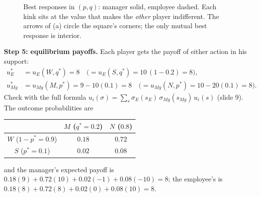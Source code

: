 \documentclass[11pt,a4paper]{article}
\begin{document}
\begin{figure}[ht]
\centering
{}
\caption{Best responses in $(p, q)$: manager solid, employee dashed. Each kink sits at the value
that makes the \emph{other} player indifferent. The arrows of (a) circle the square's corners; the
only mutual best response is interior.}
\label{fig:br}
\end{figure}

\textbf{Step 5: equilibrium payoffs.} Each player gets the payoff of either action in his support:
\begin{align*}
  u_E^* &= u_E(W, q^*) = 8 \quad\big(= u_E(S, q^*) = 10\,(1 - 0.2) = 8\big),\\
  u_{M\!g}^* &= u_{M\!g}(M, p^*) = 9 - 10(0.1) = 8 \quad\big(= u_{M\!g}(N, p^*) = 10 - 20(0.1) = 8\big).
\end{align*}
Check with the full formula $u_i(\sigma) = \sum_s \sigma_E(s_E)\,\sigma_{M\!g}(s_{M\!g})\,u_i(s)$
(slide 9). The outcome probabilities are
\begin{center}
\begin{tabular}{c|cc}
 & $M$ ($q^* = 0.2$) & $N$ ($0.8$) \\ \midrule
$W$ ($1 - p^* = 0.9$) & $0.18$ & $0.72$ \\
$S$ ($p^* = 0.1$) & $0.02$ & $0.08$
\end{tabular}
\end{center}
and the manager's expected payoff is $0.18(9) + 0.72(10) + 0.02(-1) + 0.08(-10) = 8$; the
employee's is $0.18(8) + 0.72(8) + 0.02(0) + 0.08(10) = 8$.
\end{document}
